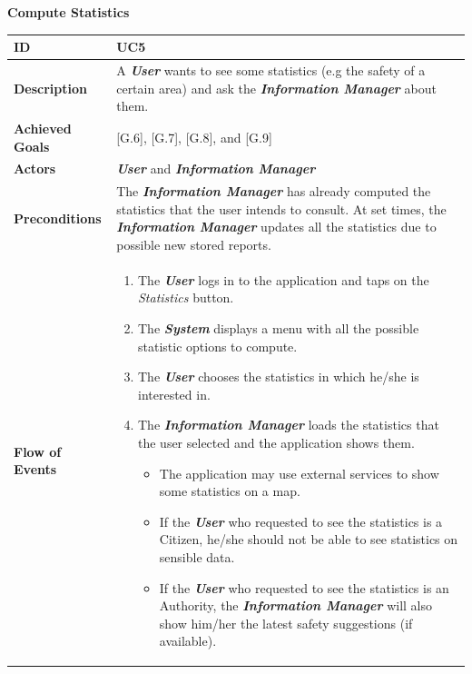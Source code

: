 \documentclass{report}
\begin{document}
\begin{center}
	\textbf{Compute Statistics}
\end{center}
\begin{tabularx}{\linewidth}{| l | X |}
	\hline
	\textbf{ID} & UC5\\
	
	\hline
	\textbf{Description} & A \textbf{\textit{User}} wants to see some statistics (e.g the safety of a certain area) and ask the \textbf{\textit{Information Manager}} about them.\\
	
	\hline
	\textbf{Achieved Goals} & {[G.6]}, {[G.7]}, {[G.8]}, and {[G.9]}\\

	\hline
	\textbf{Actors} & \textbf{\textit{User}} and \textbf{\textit{Information Manager}}\\
	
	\hline
	\textbf{Preconditions} & The \textbf{\textit{Information Manager}} has already computed the statistics that the user intends to consult. At set times, the \textbf{\textit{Information Manager}} updates all the statistics due to possible new stored reports. \\
	
	\hline
	\textbf{Flow of Events} & \parbox{0.7\textwidth}{\begin{enumerate}
			\item The \textbf{\textit{User}} logs in to the application and taps on the \textit{Statistics} button.
			\item The \textbf{\textit{System}} displays a menu with all the possible statistic options to compute.
			\item The \textbf{\textit{User}} chooses the statistics in which he/she is interested in.
			
			\item The \textbf{\textit{Information Manager}} loads the statistics that the user selected and the application shows them. 
			\begin{itemize}
				\item The application may use external services to show some statistics on a map.
				\item If the \textbf{\textit{User}} who requested to see the statistics is a Citizen, he/she should not be able to see statistics on sensible data.
				\item If the \textbf{\textit{User}} who requested to see the statistics is an Authority, the \textbf{\textit{Information Manager}} will also show him/her the latest safety suggestions (if available).
			\end{itemize}
			

\end{enumerate}}
\end{tabularx}
\end{document}

